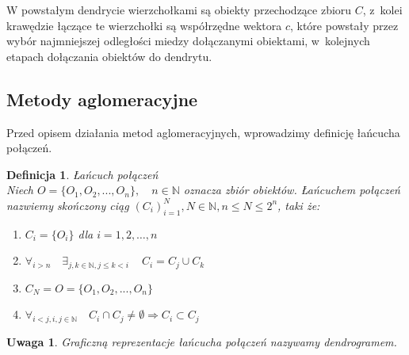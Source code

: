 \documentclass[12pt,a4paper]{report}
\newtheorem{definition}[theorem]{Definicja}
\newtheorem{uwaga}{Uwaga}
\begin{document}
W powstałym dendrycie wierzchołkami są obiekty przechodzące zbioru $C$, z~kolei krawędzie łączące te wierzchołki są współrzędne wektora $c$, które powstały przez wybór najmniejszej odległości miedzy dołączanymi obiektami, w~kolejnych etapach dołączania obiektów do dendrytu. 

\subsection{Metody aglomeracyjne}

Przed opisem działania metod aglomeracyjnych, wprowadzimy definicję łańcucha połączeń.

\begin{definition}{Łańcuch połączeń}\\
Niech $O=\{O_{1},O_{2},..., O_{n}\}, \quad n\in \mathbb{N}$ oznacza zbiór obiektów. Łańcuchem połączeń nazwiemy skończony ciąg $(C_{i})_{i=1}^{N},  N \in \mathbb{N}, n\leq N \leq 2^n$, taki że:
\begin{enumerate}
\item $C_{i}=\{O_{i}\}$ dla $i=1, 2, \ldots, n$
\item $\forall_{i > n} \quad \exists_{j, k \in \mathbb{N},  j\leq k < i~ } \quad C_{i}=C_{j} \cup C_{k}$
\item $C_{N}=O=\{O_{1},O_{2},..., O_{n}\}$
\item $\forall_{i<j,  {i,j \in \mathbb{N}}} \quad C_{i} \cap C_{j} \neq \emptyset \Rightarrow  C_{i} \subset C_{j}$ 
\end{enumerate}
\end{definition}

\begin{uwaga}
Graficzną reprezentacje łańcucha połączeń nazywamy dendrogramem. 
\end{uwaga}
\end{document}
